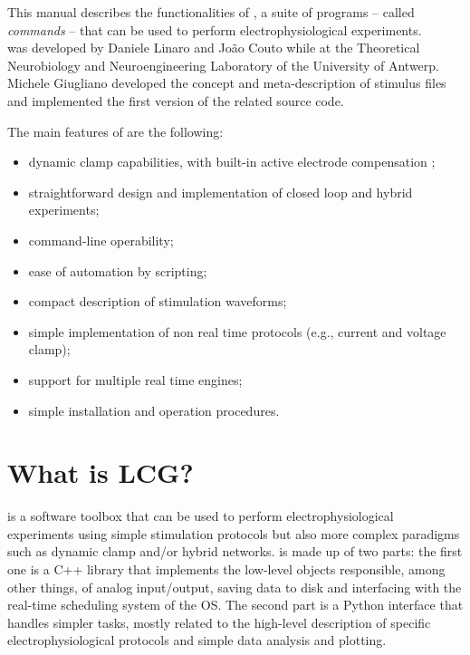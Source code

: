 This manual describes the functionalities of \progname, a suite of
programs -- called {\it commands} -- that can be used to
perform electrophysiological experiments.\\
\progname was developed by Daniele Linaro and Jo\~ao Couto while at
the Theoretical Neurobiology and Neuroengineering Laboratory of the
University of Antwerp. Michele Giugliano developed the concept and
meta-description of stimulus files and implemented the first version
of the related source code.

The main features of \progname are the following:
\begin{itemize}
\item dynamic clamp capabilities, with built-in active electrode
compensation \cite{Brette:2008};
\item straightforward design and implementation of closed loop and
hybrid experiments;
\item command-line operability;
\item ease of automation by scripting;
\item compact description of stimulation waveforms;
\item simple implementation of non real time protocols (e.g., current
  and voltage clamp);
\item support for multiple real time engines;
\item simple installation and operation procedures.
\end{itemize}

\section{What is LCG?}
%
\progname is a software toolbox that can be used to perform
electrophysiological experiments using simple stimulation protocols
but also more complex paradigms such as dynamic clamp and/or hybrid networks.
\progname is made up of two parts: the first one is a C++ library that implements the
low-level objects responsible, among other things, of analog
input/output, saving data to disk and interfacing with the real-time
scheduling system of the OS. The second part is a Python interface
that handles simpler tasks, mostly related to the high-level
description of specific electrophysiological protocols and simple data
analysis and plotting.

